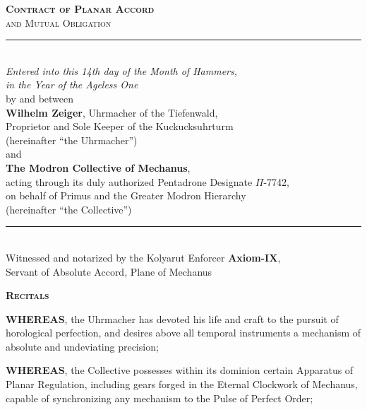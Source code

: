 \documentclass[12pt]{article}
\begin{document}

\begin{center}
{\LARGE\bfseries\scshape Contract of Planar Accord}\\[4pt]
{\large\scshape and Mutual Obligation}\\[12pt]
\rule{0.6\textwidth}{0.8pt}\\[10pt]
{\normalsize
\textit{Entered into this 14th day of the Month of Hammers,\\
in the Year of the Ageless One}\\[6pt]
by and between\\[6pt]
\textbf{Wilhelm Zeiger}, Uhrmacher of the Tiefenwald,\\
Proprietor and Sole Keeper of the Kuckucksuhrturm\\
(hereinafter ``the Uhrmacher'')\\[6pt]
and\\[6pt]
\textbf{The Modron Collective of Mechanus},\\
acting through its duly authorized Pentadrone Designate $\Pi$-7742,\\
on behalf of Primus and the Greater Modron Hierarchy\\
(hereinafter ``the Collective'')\\[6pt]
}
\rule{0.6\textwidth}{0.8pt}\\[6pt]
{\small Witnessed and notarized by the Kolyarut Enforcer \textbf{Axiom-IX},\\
Servant of Absolute Accord, Plane of Mechanus}
\end{center}

\vspace{12pt}


{\large\bfseries\scshape\centering Recitals\par}

\textbf{WHEREAS}, the Uhrmacher has devoted his life and craft to the
pursuit of horological perfection, and desires above all temporal
instruments a mechanism of absolute and undeviating precision;

\textbf{WHEREAS}, the Collective possesses within its dominion certain
Apparatus of Planar Regulation, including gears forged in the
Eternal Clockwork of Mechanus, capable of synchronizing any mechanism
to the Pulse of Perfect Order;
\end{document}
